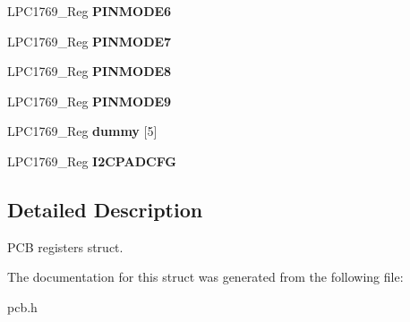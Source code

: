\begin{DoxyCompactItemize}
\item 
\hypertarget{struct_l_p_c1769___p_c_b_ac0c6f2504cc975c7cdc5cbf7b5d7fc96}{L\+P\+C1769\+\_\+\+Reg {\bfseries P\+I\+N\+M\+O\+D\+E6}}\label{struct_l_p_c1769___p_c_b_ac0c6f2504cc975c7cdc5cbf7b5d7fc96}

\item 
\hypertarget{struct_l_p_c1769___p_c_b_aa62c7b0c347088420f72b5813c81d47a}{L\+P\+C1769\+\_\+\+Reg {\bfseries P\+I\+N\+M\+O\+D\+E7}}\label{struct_l_p_c1769___p_c_b_aa62c7b0c347088420f72b5813c81d47a}

\item 
\hypertarget{struct_l_p_c1769___p_c_b_a7bf2ea56335461bd895f21f2b768644c}{L\+P\+C1769\+\_\+\+Reg {\bfseries P\+I\+N\+M\+O\+D\+E8}}\label{struct_l_p_c1769___p_c_b_a7bf2ea56335461bd895f21f2b768644c}

\item 
\hypertarget{struct_l_p_c1769___p_c_b_a1b997b7372ce5319abe07c282867174d}{L\+P\+C1769\+\_\+\+Reg {\bfseries P\+I\+N\+M\+O\+D\+E9}}\label{struct_l_p_c1769___p_c_b_a1b997b7372ce5319abe07c282867174d}

\item 
\hypertarget{struct_l_p_c1769___p_c_b_a6afdeb9bf6207dc7ae6b6795693ee3cb}{L\+P\+C1769\+\_\+\+Reg {\bfseries dummy} \mbox{[}5\mbox{]}}\label{struct_l_p_c1769___p_c_b_a6afdeb9bf6207dc7ae6b6795693ee3cb}

\item 
\hypertarget{struct_l_p_c1769___p_c_b_a84116bf3dbb7624457ee6095f63a6edc}{L\+P\+C1769\+\_\+\+Reg {\bfseries I2\+C\+P\+A\+D\+C\+F\+G}}\label{struct_l_p_c1769___p_c_b_a84116bf3dbb7624457ee6095f63a6edc}

\end{DoxyCompactItemize}


\subsection{Detailed Description}
P\+C\+B registers struct. 

The documentation for this struct was generated from the following file\+:\begin{DoxyCompactItemize}
\item 
pcb.\+h\end{DoxyCompactItemize}
